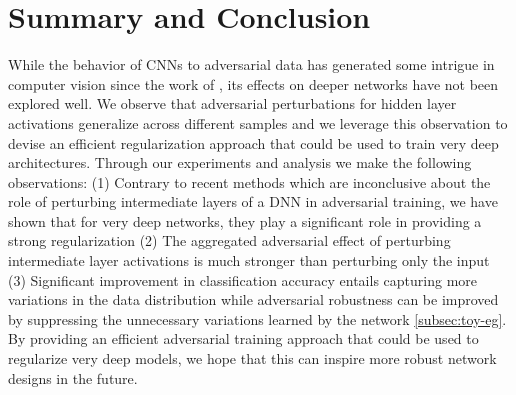 \section{Summary and Conclusion}\label{sec:conclusion}
While the behavior of CNNs to adversarial data has generated some intrigue in computer vision since the work of \cite{szegedy2013intriguing}, its effects on deeper networks have not been explored well. We observe that adversarial perturbations for hidden layer activations generalize across different samples and we leverage this observation to devise an efficient regularization approach that could be used to train very deep architectures.  Through our experiments and analysis we make the following observations: (1) Contrary to recent methods which are inconclusive about the role of perturbing intermediate layers of a DNN in adversarial training, we have shown that for very deep networks, they play a significant role in providing a strong regularization (2) The aggregated adversarial effect of perturbing intermediate layer activations is much stronger than perturbing only the input (3) Significant improvement in classification accuracy entails capturing more variations in the data distribution while adversarial robustness can be improved by suppressing the unnecessary variations learned by the network \ref{subsec:toy-eg}. By providing an efficient adversarial training approach that could be used to regularize very deep models, we hope that this can inspire more robust network designs in the future. 

